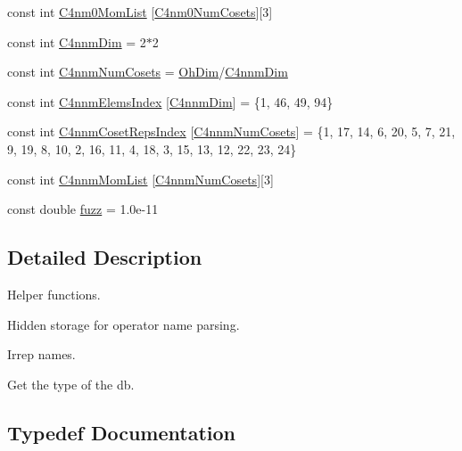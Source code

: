 \begin{DoxyCompactItemize}
\item 
const int \mbox{\hyperlink{namespaceHadron_a09e727ed9485ae1b66ca52813ac86201}{C4nm0\+Mom\+List}} \mbox{[}\mbox{\hyperlink{namespaceHadron_a8e76f646995d145588abe6831d8e9041}{C4nm0\+Num\+Cosets}}\mbox{]}\mbox{[}3\mbox{]}
\item 
const int \mbox{\hyperlink{namespaceHadron_af60ad76cc44b9d853ae699af88a1a5cb}{C4nnm\+Dim}} = 2$\ast$2
\item 
const int \mbox{\hyperlink{namespaceHadron_a016c7cde3e8e01232fb1cfc3db8d8b54}{C4nnm\+Num\+Cosets}} = \mbox{\hyperlink{namespaceHadron_a2bea98b7ecd13619ef78b6d204d59707}{Oh\+Dim}}/\mbox{\hyperlink{namespaceHadron_af60ad76cc44b9d853ae699af88a1a5cb}{C4nnm\+Dim}}
\item 
const int \mbox{\hyperlink{namespaceHadron_a6352bd80b67b77534019070d2e8ada82}{C4nnm\+Elems\+Index}} \mbox{[}\mbox{\hyperlink{namespaceHadron_af60ad76cc44b9d853ae699af88a1a5cb}{C4nnm\+Dim}}\mbox{]} = \{1, 46, 49, 94\}
\item 
const int \mbox{\hyperlink{namespaceHadron_a45efc71874946f8e0f89c14717a06a68}{C4nnm\+Coset\+Reps\+Index}} \mbox{[}\mbox{\hyperlink{namespaceHadron_a016c7cde3e8e01232fb1cfc3db8d8b54}{C4nnm\+Num\+Cosets}}\mbox{]} = \{1, 17, 14, 6, 20, 5, 7, 21, 9, 19, 8, 10, 2, 16, 11, 4, 18, 3, 15, 13, 12, 22, 23, 24\}
\item 
const int \mbox{\hyperlink{namespaceHadron_a2ec1cded04eb336aa68867febe1878cb}{C4nnm\+Mom\+List}} \mbox{[}\mbox{\hyperlink{namespaceHadron_a016c7cde3e8e01232fb1cfc3db8d8b54}{C4nnm\+Num\+Cosets}}\mbox{]}\mbox{[}3\mbox{]}
\item 
const double \mbox{\hyperlink{namespaceHadron_a3ad10e2a91a0e758b6b378c0c2f57fc8}{fuzz}} = 1.\+0e-\/11
\end{DoxyCompactItemize}


\subsection{Detailed Description}
Helper functions. 

Hidden storage for operator name parsing.

Irrep names.

Get the type of the db. 

\subsection{Typedef Documentation}
\mbox{\label{namespaceHadron_abaab2f90393b8dd8d93060e6ce6568e7}} 
